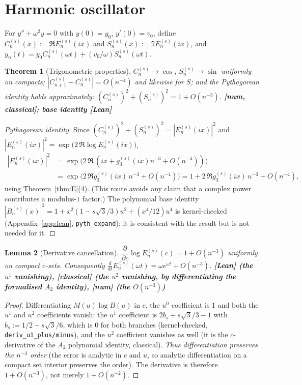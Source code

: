 \documentclass[11pt]{article}
\theoremstyle{plain}
\newtheorem{theorem}{Theorem}
\newtheorem{lemma}[theorem]{Lemma}
\theoremstyle{definition}
\theoremstyle{remark}
\begin{document}
\section{Harmonic oscillator}

For $y''+\omega^2y=0$ with $y(0)=y_0$, $y'(0)=v_0$, define
$C_n^{(s)}(x) := \Re E_n^{(s)}(ix)$ and $S_n^{(s)}(x) := \Im E_n^{(s)}(ix)$,
and $y_n(t) = y_0C_n^{(s)}(\omega t) + (v_0/\omega)S_n^{(s)}(\omega t)$.

\begin{theorem}[Trigonometric properties]\label{thm:trig}
$C_n^{(s)}\to\cos$, $S_n^{(s)}\to\sin$ uniformly on compacts;
$|C_{n+1}^{(s)}-C_n^{(s)}| = O(n^{-4})$ and likewise for $S$; and the
Pythagorean identity holds approximately:
$(C_n^{(s)})^2 + (S_n^{(s)})^2 = 1 + O(n^{-3})$.
\hfill\textbf{[num, classical]; base identity [Lean]}
\end{theorem}
\begin{proof}[Pythagorean identity]
Since $(C_n^{(s)})^2 + (S_n^{(s)})^2 = |E_n^{(s)}(ix)|^2$ and
$|E_n^{(s)}(ix)|^2 = \exp\bigl(2\,\Re\log E_n^{(s)}(ix)\bigr)$,
\begin{align*}
  |E_n^{(s)}(ix)|^2
    &= \exp\bigl(2\,\Re\,(ix + g_3^{(s)}(ix)n^{-3} + O(n^{-4}))\bigr) \\
    &= \exp\bigl(2\,\Re g_3^{(s)}(ix)\,n^{-3} + O(n^{-4})\bigr)
     = 1 + 2\,\Re g_3^{(s)}(ix)\,n^{-3} + O(n^{-4}),
\end{align*}
using Theorem~\ref{thm:E}(4). (This route avoids any claim that a complex power
contributes a modulus-$1$ factor.) The polynomial base identity
$|B_n^{(s)}(x)|^2 = 1 + x^2(1 - s\sqrt3/3)u^2 + (x^4/12)u^4$ is
kernel-checked (Appendix~\ref{app:lean}, \texttt{pyth\_expand}); it is consistent
with the result but is not needed for it.
\end{proof}

\begin{lemma}[Derivative cancellation]\label{lem:deriv}
$\dfrac{\partial}{\partial c}\log E_n^{(s)}(c) = 1 + O(n^{-3})$ uniformly on
compact $c$-sets. Consequently
$\frac{d}{dt}E_n^{(s)}(\omega t) = \omega e^{\omega t} + O(n^{-3})$.
\hfill\textbf{[Lean] (the $u^1$ vanishing), [classical] (the $u^2$ vanishing, by differentiating the formalised $A_2$ identity), [num] (the $O(n^{-3})$)}
\end{lemma}
\begin{proof}
Differentiating $M(u)\log B(u)$ in $c$, the $u^0$ coefficient is $1$ and both the
$u^1$ and $u^2$ coefficients vanish: the $u^1$ coefficient is
$2b_s + s\sqrt3/3 - 1$ with $b_s := 1/2 - s\sqrt3/6$, which is $0$ for both
branches (kernel-checked, \texttt{deriv\_u1\_plus/minus}), and the $u^2$
coefficient vanishes as well (it is the $c$-derivative of the $A_2$ polynomial
identity, classical). \emph{Thus differentiation preserves the $n^{-3}$
order} (the error is analytic in $c$ and $u$, so analytic differentiation on a
compact set interior preserves the order). The derivative is therefore
$1+O(n^{-3})$, not merely $1+O(n^{-2})$.
\end{proof}
\end{document}
